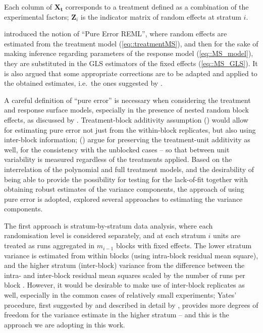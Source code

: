 Each column of $\bm{X_t}$ corresponds to a treatment defined as a combination of the experimental factors;
$\bm{Z}_{i}$ is the indicator matrix of random effects at stratum $i$.

\cite{GilmourGoos2016PEREML} introduced the notion of ``Pure Error REML'', where random effects are estimated from the treatment model (\ref{eq::treatmentMS}), and then for the sake of making inference regarding parameters of the response model (\ref{eq::MS_model}), they are substituted in the GLS estimators of the fixed effects (\ref{eq::MS_GLS}). It is also argued that some appropriate corrections are to be adapted and applied to the obtained estimates, i.e.~the ones suggested by \cite{kenward1997small}. 

A careful definition of ``pure error'' is necessary when considering the treatment and response surface models, especially in the presence of nested random block effects, as discussed by \cite{Gilmour2000PErsm}.  Treatment-block additivity  assumption (\cite{Draper1998}) would allow for estimating pure error not just from the within-block replicates, but also using inter-block information; (\cite{Gilmour2000PErsm}) argue for preserving the treatment-unit additivity as well, for the consistency with the unblocked cases -- so that between unit variability is measured regardless of the treatments applied. Based on the interrelation of the polynomial and full treatment models, and the desirability of being able to provide the possibility for testing for the lack-of-fit together with obtaining robust estimates of the variance components, the approach of using pure error is adopted, \cite{GilmourGoos2016Robust} explored several approaches to estimating the variance components. 

The first approach is stratum-by-stratum data analysis, where each randomisation level is considered separately, and at each stratum $i$ units are treated as runs aggregated in $m_{i-1}$ blocks with fixed effects. The lower stratum variance is estimated from within blocks (using intra-block residual mean square), and the higher stratum (inter-block) variance from the difference between the intra- and inter-block residual mean squares scaled by the number of runs per block \citep{Hinkelmann2005Advanced}. However, it would be desirable to make use of inter-block replicates as well, especially in the common cases of relatively small experiments; Yates' procedure, first suggested by \cite{yates1939recovery} and described in detail by \cite{Hinkelmann2005Advanced}, provides more degrees of freedom for the variance estimate in the higher stratum -- and this is the approach we are adopting in this work. 


